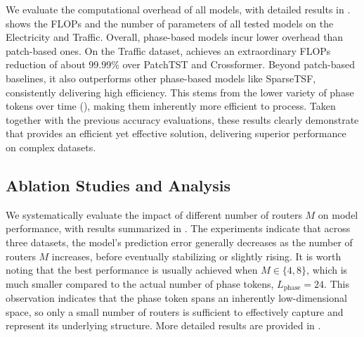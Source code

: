 We evaluate the computational overhead of all models, with detailed results in .
 shows the FLOPs and the number of parameters of all tested models on the Electricity and Traffic.
Overall, phase-based models incur lower overhead than patch-based ones.
On the Traffic dataset, \sysname achieves an extraordinary FLOPs reduction of about 99.99\% over PatchTST and Crossformer.
Beyond patch-based baselines, it also outperforms other phase-based models like SparseTSF, consistently delivering high efficiency.
This stems from the lower variety of phase tokens over time (), making them inherently more efficient to process. 
Taken together with the previous accuracy evaluations, these results clearly demonstrate that \sysname provides an efficient yet effective solution, delivering superior performance on complex datasets.



\subsection{Ablation Studies and Analysis}

We systematically evaluate the impact of different number of routers $M$ on model performance, with results summarized in .
The experiments indicate that across three datasets, the model’s prediction error generally decreases as the number of routers $M$ increases, before eventually stabilizing or slightly rising.
It is worth noting that the best performance is usually achieved when $M \in \{4,8\}$, which is much smaller compared to the actual number of phase tokens, $L_{\text{phase}} = 24$.
This observation indicates that the phase token spans an inherently low-dimensional space, so only a small number of routers is sufficient to effectively capture and represent its underlying structure.
More detailed results are provided in .

